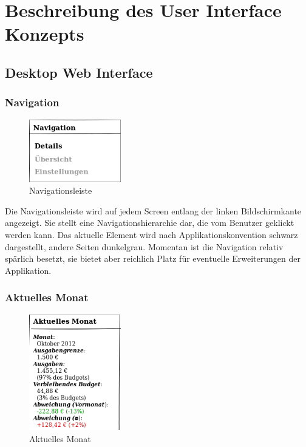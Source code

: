 \section{Beschreibung des User Interface Konzepts}

\subsection{Desktop Web Interface}

\subsubsection{Navigation} \label{subsubsection:navigation}

\begin{figure}[htl]
\centering
\includegraphics[width=4cm]{img/web_navigation}
\caption{Navigationsleiste}
\label{fig:web_navigation}
\end{figure}

Die Navigationsleiste wird auf jedem Screen entlang der linken Bildschirmkante
angezeigt. Sie stellt eine Navigationshierarchie dar, die vom Benutzer geklickt
werden kann. Das aktuelle Element wird nach Applikationskonvention schwarz
dargestellt, andere Seiten dunkelgrau.  Momentan ist die Navigation relativ
spärlich besetzt, sie bietet aber reichlich Platz für eventuelle Erweiterungen
der Applikation.

\subsubsection{Aktuelles Monat} \label{subsubsection:aktuelles_monat}

\begin{figure}[htl]
\centering
\includegraphics[width=4cm]{img/web_current_month}
\caption{Aktuelles Monat}
\label{fig:web_current_month}
\end{figure}

